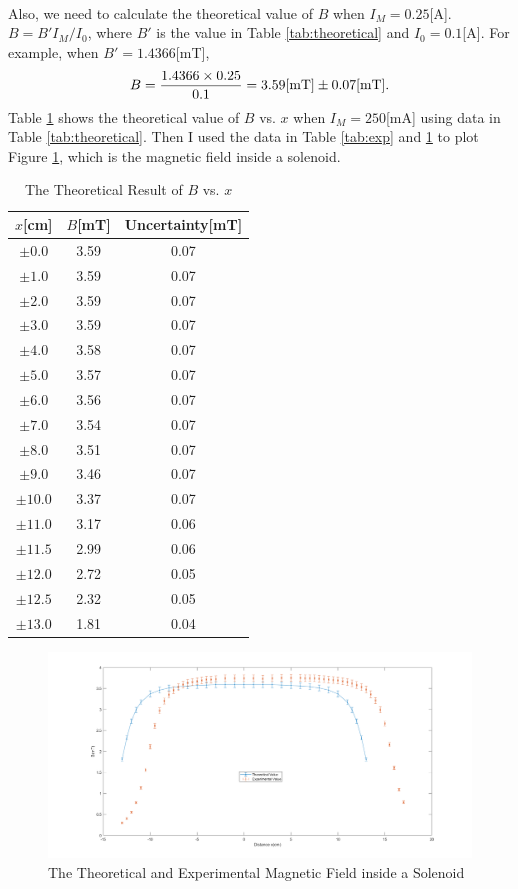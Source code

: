 \documentclass[a4paper]{article}
\begin{document}
    \paragraph{}Also, we need to calculate the theoretical value of $B$ when $I_M=0.25$[A]. $B=B'I_M/I_0$, where $B'$ is the value in Table \ref{tab:theoretical} and $I_0=0.1$[A]. For example, when $B'=1.4366$[mT], $$B=\frac{1.4366\times 0.25}{0.1}=3.59[\rm mT]\pm 0.07[mT].$$ Table \ref{tab:theory} shows the theoretical value of $B$ vs. $x$ when $I_M=250$[mA] using data in Table \ref{tab:theoretical}. Then I used the data in Table \ref{tab:exp} and \ref{tab:theory} to plot Figure \ref{fig:Bvsx}, which is the magnetic field inside a solenoid.
    \begin{table}[H]
        \centering
        \begin{tabular}{|c|c|c|}
            \hline
            $x$[cm]&$B$[mT]&Uncertainty[mT]\\\hline
            $\pm 0.0$&3.59&0.07\\\hline
            $\pm 1.0$&3.59&0.07\\\hline
            $\pm 2.0$&3.59&0.07\\\hline
            $\pm 3.0$&3.59&0.07\\\hline
            $\pm 4.0$&3.58&0.07\\\hline
            $\pm 5.0$&3.57&0.07\\\hline
            $\pm 6.0$&3.56&0.07\\\hline
            $\pm 7.0$&3.54&0.07\\\hline
            $\pm 8.0$&3.51&0.07\\\hline
            $\pm 9.0$&3.46&0.07\\\hline
            $\pm 10.0$&3.37&0.07\\\hline
            $\pm 11.0$&3.17&0.06\\\hline
            $\pm 11.5$&2.99&0.06\\\hline
            $\pm 12.0$&2.72&0.05\\\hline
            $\pm 12.5$&2.32&0.05\\\hline
            $\pm 13.0$&1.81&0.04\\\hline
        \end{tabular}
        \caption{The Theoretical Result of $B$ vs. $x$}
        \label{tab:theory}
    \end{table}
    \begin{figure}[H]
        \centering
        \includegraphics[width=\textwidth]{fig/Bvsx.png}
        \caption{The Theoretical and Experimental Magnetic Field inside a Solenoid}
        \label{fig:Bvsx}
    \end{figure}
\end{document}
